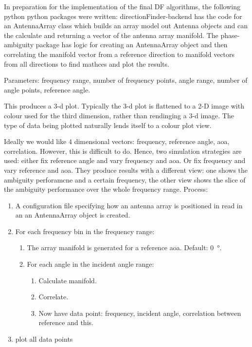 In preparation for the implementation of the final DF algorithms, the following python python packages were written: 
directionFinder-backend has the code for an AntennaArray class which builds an array model out Antenna objects and can the calculate and returning a vector of the antenna array manifold. The phase-ambiguity package has logic for creating an AntennaArray object and then correlating the manifold vector from a reference direction to manifold vectors from all directions to find mathces and plot the results.

Parameters:
frequency range, number of frequency points, angle range, number of angle points, reference angle.

This produces a 3-d plot. Typically the 3-d plot is flattened to a 2-D image with colour used for the third dimension, rather than rendinging a 3-d image. The type of data being plotted naturally lends itself to a colour plot view.


Ideally we would like 4 dimensional vectors: frequency, reference angle, aoa, correlation. However, this is difficult to do. Hence, two simulation strategies are used: either fix reference angle and vary frequency and aoa. Or fix frequency and vary reference and aoa. They produce results with a different view: one shows the ambiguity perforamcne and a certain frequency, the other view shows the slice of the ambiguity performance over the whole frequency range. Process:

\begin{enumerate}
  \item A configuration file specifying how an antenna array is positioned in read in an an AntennaArray object is created.
  \item For each frequency bin in the frequency range:
  \begin{enumerate}
    \item The array manifold is generated for a reference \gls{aoa}. Default: \SI{0}{\degree}.
    \item For each angle in the incident angle range:
    \begin{enumerate}
      \item Calculate manifold.
      \item Correlate.
      \item Now have data point: frequency, incident angle, correlation between reference and this.
    \end{enumerate}
  \end{enumerate}
  \item plot all data points
\end{enumerate}

